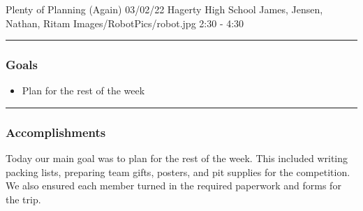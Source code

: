 \insertmeeting 
	{Plenty of Planning (Again)} 
	{03/02/22} 
	{Hagerty High School}
	{James, Jensen, Nathan, Ritam}
	{Images/RobotPics/robot.jpg}
	{2:30 - 4:30}
	
\noindent\hfil\rule{\textwidth}{.4pt}\hfil
\subsubsection*{Goals}
\begin{itemize}
    \item Plan for the rest of the week

\end{itemize} 

\noindent\hfil\rule{\textwidth}{.4pt}\hfil

\subsubsection*{Accomplishments}
Today our main goal was to plan for the rest of the week. This included writing packing lists, preparing team gifts, posters, and pit supplies for the competition. We also ensured each member turned in the required paperwork and forms for the trip. 


